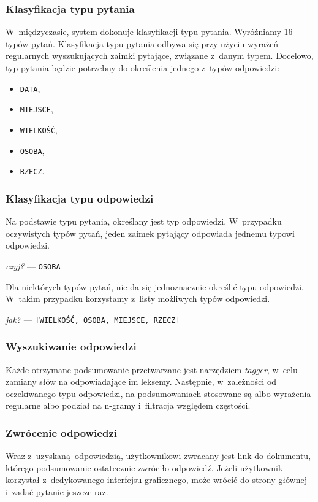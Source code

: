 \documentclass{beamer}
\begin{document}
\begin{frame}
  \frametitle{Klasyfikacja typu pytania}
  W~międzyczasie, system dokonuje klasyfikacji typu pytania. Wyróżniamy 16 typów pytań. Klasyfikacja typu pytania odbywa się przy użyciu wyrażeń regularnych wyszukujących zaimki pytające, związane z~danym typem. Docelowo, typ pytania będzie potrzebny do określenia jednego z~typów odpowiedzi:
  \begin{itemize}
    \item \texttt{DATA},
    \item \texttt{MIEJSCE},
    \item \texttt{WIELKOŚĆ},
    \item \texttt{OSOBA},
    \item \texttt{RZECZ}.
  \end{itemize}
\end{frame}

\begin{frame}
  \frametitle{Klasyfikacja typu odpowiedzi}
  Na podstawie typu pytania, określany jest typ odpowiedzi. W~przypadku oczywistych typów pytań, jeden zaimek pytający odpowiada jednemu typowi odpowiedzi. 
  \begin{center}
    \textit{czyj?} --- \texttt{OSOBA}
  \end{center}
  Dla niektórych typów pytań, nie da się jednoznacznie określić typu odpowiedzi. W~takim przypadku korzystamy z~listy możliwych typów odpowiedzi.
  \begin{center}
    \textit{jak?} --- \texttt{[WIELKOŚĆ, OSOBA, MIEJSCE, RZECZ]}
  \end{center}
\end{frame}

\begin{frame}
  \frametitle{Wyszukiwanie odpowiedzi}
  Każde otrzymane podsumowanie przetwarzane jest narzędziem \textit{tagger}, w~celu zamiany słów na odpowiadające im leksemy. Następnie, w~zależności od oczekiwanego typu odpowiedzi,
  na podsumowaniach stosowane są albo wyrażenia regularne albo podział na n-gramy i~filtracja względem częstości.
\end{frame}

\begin{frame}
  \frametitle{Zwrócenie odpowiedzi}
  Wraz z~uzyskaną odpowiedzią, użytkownikowi zwracany jest link do dokumentu, którego podsumowanie ostatecznie zwróciło odpowiedź. Jeżeli użytkownik korzystał z~dedykowanego interfejsu graficznego, może wrócić do strony głównej i~zadać pytanie jeszcze raz.
\end{frame}
\end{document}
